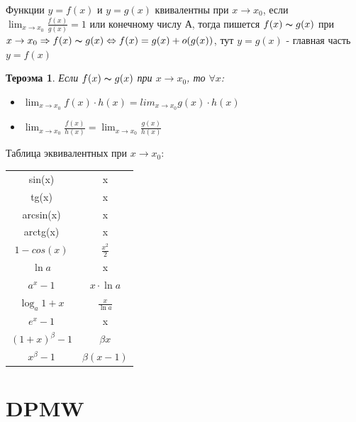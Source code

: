 \documentclass[oneside]{book}
\newtheorem{thm}{Тероэма}[chapter] %
\begin{document}
\begin{enumerate}
    Функции $y = f(x)$ и $y = g(x)$ квивалентны при $x \rightarrow x_0$, если $\lim_{x \rightarrow x_0}{\frac{f(x)}{g(x)}} = 1$ или
    конечному числу А, тогда пишется $f(x) \thicksim g(x)$ при $x \rightarrow x_0 \Rightarrow f(x) \thicksim g(x) \Leftrightarrow
    f(x) = g(x) + o(g(x))$, тут $y = g(x)$ - главная часть $y = f(x)$
    \begin{thm}
        Если $f(x) \thicksim g(x)$ при $x \rightarrow x_0$, то $\forall x$: \begin{itemize}
            \item $\lim_{x \rightarrow x_0}{f(x) \cdot h(x)} = lim_{x \rightarrow x_0}{g(x) \cdot h(x)}$
            \item $\lim_{x \rightarrow x_0}{\frac{f(x)}{h(x)}} = \lim_{x \rightarrow x_0}{\frac{g(x)}{h(x)}}$
        \end{itemize}
    \end{thm}
    Таблица эквивалентных при $x \rightarrow x_0$: \\
    \begin{center}
        \begin{tabular}{c|c}
            sin(x) & x\\
            tg(x) & x\\
            arcsin(x) & x\\
            arctg(x) & x\\
            $1 - cos(x)$ & $\frac{x^2}{2}$ \\
            $\ln{a}$ & x \\
            $a^x - 1$ & $x \cdot \ln{a}$ \\
            $\log_{a}{1+x}$ & $\frac{x}{\ln{a}}$ \\
            $e^x - 1$ & x \\
            $(1+x)^\beta - 1$ & $\beta x$ \\
            $x^\beta - 1$ & $\beta(x-1)$
        \end{tabular}
    \end{center}

\chapter{DPMW}


\end{enumerate}
\end{document}
